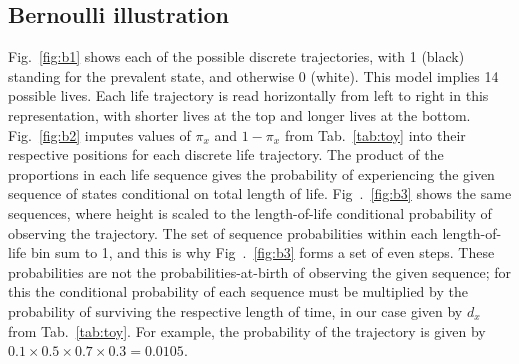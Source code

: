 \documentclass{bmcart}
\begin{document}
\subsection{Bernoulli illustration}
\label{sec:bi}
Fig.~\ref{fig:b1} shows each of the possible discrete trajectories, with 1 (black) standing for the prevalent state, and otherwise 0 (white). This model implies 14 possible lives. Each life trajectory is read horizontally from left to right in this representation, with shorter lives at the top and longer lives at the bottom. Fig.~\ref{fig:b2} imputes values of $\pi_x$ and $1-\pi_x$ from Tab.~\ref{tab:toy} into their respective positions for each discrete life trajectory. The product of the proportions in each life sequence gives the probability of experiencing the given sequence of states conditional on total length of life. Fig~.~\ref{fig:b3} shows the same sequences, where height is scaled to the length-of-life conditional probability of observing the trajectory. The set of sequence probabilities within each length-of-life bin sum to 1, and this is why Fig~.~\ref{fig:b3} forms a set of even steps. These probabilities are not the probabilities-at-birth of observing the given sequence; for this the conditional probability of each sequence must be multiplied by the probability of surviving the respective length of time, in our case given by $d_x$ from Tab.~\ref{tab:toy}. For example, the probability of the  trajectory is given by $0.1\times 0.5\times 0.7\times 0.3 = 0.0105$.
\end{document}

